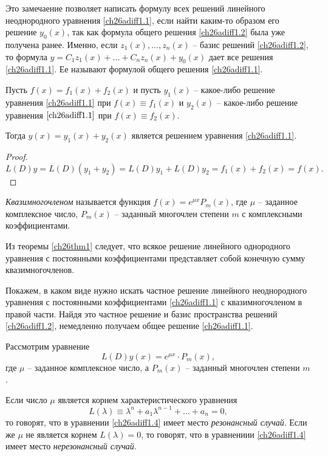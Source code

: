 Это замечаение позволяет написать формулу всех решений линейного неоднородного уравнения \eqref{ch26adiff1.1}, если найти каким-то образом его решение $y_0(x)$, так как формула общего решения \eqref{ch26adiff1.2} была уже получена ранее. Именно, если $z_1(x),...,z_n(x)$ -- базис решений \eqref{ch26adiff1.2}, то формула $y=C_1z_1(x)+...+C_nz_n(x)+y_0(x)$ дает все решения \eqref{ch26adiff1.1}. Ее называют формулой общего решения \eqref{ch26adiff1.1}.

\begin{lemm}
Пусть $f(x)=f_1(x)+f_2(x)$ и пусть $y_1(x)$ -- какое-либо решение уравнения \eqref{ch26adiff1.1} при $f(x)\equiv f_1(x)$ и $y_2(x)$ -- какое-либо решение уравнения $\eqref{ch26adiff1.1}$ при $f(x) \equiv f_2(x)$.

Тогда $y(x)=y_1(x)+y_2(x)$ является решением уравнения \eqref{ch26adiff1.1}.
\end{lemm}

\begin{proof}
$$
L(D)y=L(D)(y_1+y_2)=L(D)y_1+L(D)y_2=f_1(x)+f_2(x)=f(x).
$$
\end{proof}

\begin{defn}
\textit{Квазимногочленом} называется функция $f(x)=e^{\mu x}P_m(x)$, где $\mu$ -- заданное комплексное число, $P_m(x)$ -- заданный многочлен степени $m$ с комплексными коэффициентами.
\end{defn}

Из теоремы \ref{ch26thm1} следует, что всякое решение линейного однородного уравнения с постоянными коэффициентами представляет собой конечную сумму квазимногочленов.

Покажем, в каком виде нужно искать частное решение линейного неоднородного уравнения с постоянными коэффициентами \eqref{ch26adiff1.1} с квазимногочленом в правой части. Найдя это частное решение и базис пространства решений \eqref{ch26adiff1.2}, немедленно получаем общее решение \eqref{ch26adiff1.1}.

Рассмотрим уравнение
\begin{equation}\label{ch26adiff1.4}
L(D)y(x)=e^{\mu x}\cdot P_m(x),
\end{equation}
где $\mu$ -- заданное комплексное число, а $P_m(x)$ -- заданный многочлен степени $m$.

\begin{defn}
Если число $\mu$ является корнем характеристического уравнения
$$
L(\lambda)\equiv \lambda^n+a_1\lambda^{n-1}+...+a_n=0,
$$
то говорят, что в уравнении \eqref{ch26adiff1.4} имеет место \textit{резонансный случай}. Если же $\mu$ не является корнем $L(\lambda)=0$, то говорят, что в уравнениии \eqref{ch26adiff1.4} имеет место \textit{нерезонансный случай}.
\end{defn}

